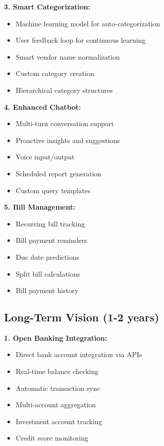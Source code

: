 \documentclass[11pt,a4paper]{report}
\begin{document}
\begin{itemize}
\textbf{3. Smart Categorization:}
\begin{itemize}
    \item Machine learning model for auto-categorization
    \item User feedback loop for continuous learning
    \item Smart vendor name normalization
    \item Custom category creation
    \item Hierarchical category structures
\end{itemize}

\textbf{4. Enhanced Chatbot:}
\begin{itemize}
    \item Multi-turn conversation support
    \item Proactive insights and suggestions
    \item Voice input/output
    \item Scheduled report generation
    \item Custom query templates
\end{itemize}

\textbf{5. Bill Management:}
\begin{itemize}
    \item Recurring bill tracking
    \item Bill payment reminders
    \item Due date predictions
    \item Split bill calculations
    \item Bill payment history
\end{itemize}

\subsection{Long-Term Vision (1-2 years)}

\textbf{1. Open Banking Integration:}
\begin{itemize}
    \item Direct bank account integration via APIs
    \item Real-time balance checking
    \item Automatic transaction sync
    \item Multi-account aggregation
    \item Investment account tracking
    \item Credit score monitoring
\end{itemize}


\end{itemize}
\end{document}
